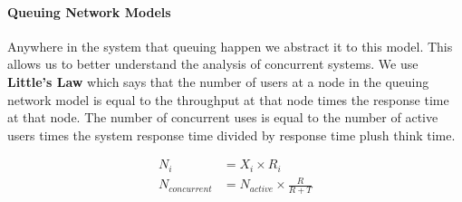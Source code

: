 \documentclass{article}
\begin{document}
\paragraph{Queuing Network Models} %
\label{par:queuing_network_models}
Anywhere in the system that queuing happen we abstract it to this model. This allows us to better understand the analysis of concurrent systems. We use \textbf{Little's Law} which says that the number of users at a node in the queuing network model is equal to the throughput at that node times the response time at that node. The number of concurrent uses is equal to the number of active users times the system response time divided by response time plush think time.

\begin{align*}
    N_i &= X_i \times R_i\\
    N_{concurrent} &= N_{active}\times \frac{R}{R+T}
\end{align*}



\end{document}
